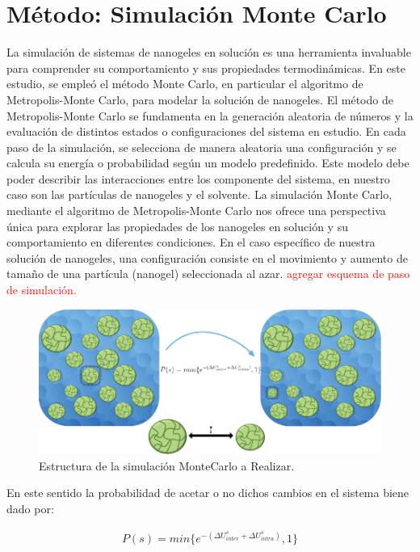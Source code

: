\section{M\'etodo: Simulaci\'on Monte Carlo}


La simulaci\'on de sistemas de nanogeles en soluci\'on es una herramienta invaluable para comprender su comportamiento y sus propiedades termodin\'amicas. En este estudio, se emple\'o el m\'etodo Monte Carlo, en particular el algoritmo de Metropolis-Monte Carlo, para modelar la soluci\'on de nanogeles.
El m\'etodo de Metropolis-Monte Carlo \addcite se fundamenta en la generaci\'on aleatoria de n\'umeros y la evaluaci\'on de distintos estados o configuraciones del sistema en estudio. En cada paso de la simulaci\'on, se selecciona de manera aleatoria una configuraci\'on y se calcula su energ\'ia o probabilidad seg\'un un modelo predefinido. Este modelo debe poder describir las interacciones entre los componente del sistema, en nuestro caso son las part\'iculas de nanogeles y el solvente.
La simulaci\'on Monte Carlo, mediante el algoritmo de Metropolis-Monte Carlo nos ofrece una perspectiva \'unica para explorar las propiedades de los nanogeles en soluci\'on y su comportamiento en diferentes condiciones. 
En el caso espec\'ifico de nuestra soluci\'on de nanogeles, una configuraci\'on consiste en el movimiento y aumento de tama\~no de una part\'icula (nanogel) seleccionada al azar. 
\textcolor{red}{agregar esquema de paso de simulaci\'on.}

\begin{figure}[!htb]
	\centering
	\includegraphics[width=1.0\textwidth]{Figures/modelos/mc_model.pdf}
	\caption{Estructura de la simulaci\'on MonteCarlo a Realizar.}
	\label{fig:mc:sistema_mc}
\end{figure}
En este sentido la probabilidad de acetar o no dichos cambios en el sistema biene dado por:

\begin{align}
	P(s) = min \{e^{-(\Delta U^s_{inter} + \Delta U^s_{intra})},1\}
\end{align}

